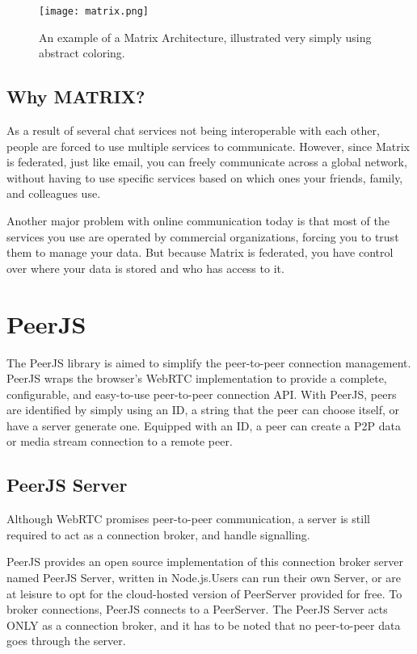\begin{figure}[h]
    \begin{center}
        \texttt{[image: matrix.png]}
    \end{center}
    \caption{An example of a Matrix Architecture, illustrated very simply using abstract coloring.}
    \label{fig:matrix}
\end{figure}

\subsection{Why MATRIX?}

As a result of several chat services not being interoperable with each other, people are 
forced to use multiple services to communicate.
However, since Matrix is federated, just like email, you can freely communicate across a 
global network, without having to use specific services based on which ones your friends, 
family, and colleagues use.

Another major problem with online communication today is that most of the services you
use are operated by commercial organizations, forcing you to trust them to manage your data.
But because Matrix is federated, you have control over where your data is stored and who has access to it.~\cite{RumaWhyMatrix} 

\section{PeerJS}

The PeerJS library is aimed to simplify the peer-to-peer connection management. 
PeerJS wraps the browser's WebRTC implementation to provide a complete, configurable, 
and easy-to-use peer-to-peer connection API. 
With PeerJS, peers are identified by simply using an ID, a string that the peer 
can choose itself, or have a server generate one. 
Equipped with an ID, a peer can create a P2P data or media stream connection to a remote peer.~\cite{PeerJSsimplifiesWebRTC}

\subsection{PeerJS Server}

Although WebRTC promises peer-to-peer communication, a server is still required to 
act as a connection broker, and handle signalling.

PeerJS provides an open source implementation of this connection broker 
server named PeerJS Server, written in Node.js.Users can run their own Server, 
or are at leisure to opt for the cloud-hosted version of PeerServer provided for free.
To broker connections, PeerJS connects to a PeerServer. The PeerJS Server acts ONLY as 
a connection broker, and it has to be noted that no peer-to-peer data goes through the server.~\cite{TamingWebRTCwithPeerJS}

